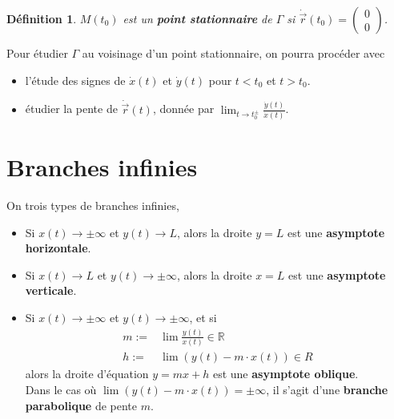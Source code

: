 \documentclass[10pt,a4paper]{book}
\newcommand{\R}{\mathbb{R}}
\newtheorem{definition}{Définition}[section]
\begin{document}
\begin{definition}
$M(t_0)$ est un \textbf{point stationnaire} de $\Gamma$ si $\dot{\vec{r}}(t_0) = \left( \begin{array}{c} 0 \\ 0\end{array} \right)$.
\end{definition}
Pour étudier $\Gamma$ au voisinage d'un point stationnaire, on pourra procéder avec
\begin{itemize}
\item l'étude des signes de $\dot{x}(t)$ et $\dot{y}(t)$ pour $t < t_0$ et $t > t_0$.
\item étudier la pente de $\dot{\vec{r}}(t)$, donnée par $\lim_{t \rightarrow t_0^{\pm}} \frac{\dot{y}(t)}{\dot{x}(t)}$.
\end{itemize}

\section{Branches infinies}

On trois types de branches infinies,
\begin{itemize}
\item Si $x(t)\rightarrow \pm \infty$ et $y(t) \rightarrow L$, alors la droite $y=L$ est une \textbf{asymptote horizontale}.
\item Si $x(t)\rightarrow L$ et $y(t) \rightarrow \pm \infty$, alors la droite $x=L$ est une \textbf{asymptote verticale}.
\item Si $x(t)\rightarrow \pm \infty$ et $y(t) \rightarrow \pm \infty$, et si
\begin{equation*}
\begin{split}
m := & \lim \frac{y(t)}{x(t)} \in \R \\
h := & \lim(y(t) - m\cdot x(t)) \in R
\end{split}
\end{equation*}
alors la droite d'équation $y = mx + h$ est une \textbf{asymptote oblique}. \\
Dans le cas où $\lim(y(t) - m\cdot x(t)) = \pm \infty$, il s'agit d'une \textbf{branche parabolique} de pente $m$.
\end{itemize}
\end{document}
